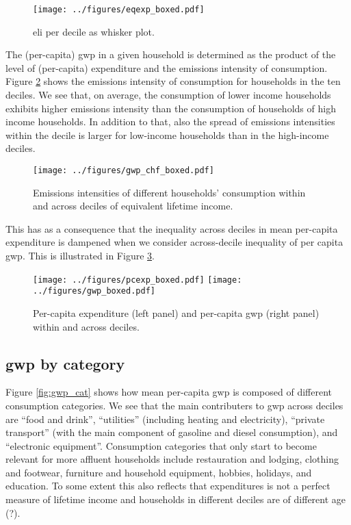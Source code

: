 \documentclass[a4paper,11pt]{article}
\begin{document}
\begin{figure}[htp]
  \centering
  \texttt{[image: ../figures/eqexp\_boxed.pdf]}
  \caption{\ac{eli} per decile as whisker plot.}
  \label{fig:eli}
\end{figure}

The (per-capita) \ac{gwp} in a given household is determined as the product of the level of (per-capita) expenditure and the emissions intensity of consumption.
Figure \ref{fig:int} shows the emissions intensity of consumption for households in the ten deciles.
We see that, on average, the consumption of lower income households exhibits higher emissions intensity than the consumption of households of high income households.
In addition to that, also the spread of emissions intensities within the decile is larger for low-income households than in the high-income deciles.

\begin{figure}[htp]
  \centering
  \texttt{[image: ../figures/gwp\_chf\_boxed.pdf]}
  \caption[Emissions intensities across deciles]{Emissions intensities of different households' consumption within and across deciles of equivalent lifetime income.}
  \label{fig:int}
\end{figure}

This has as a consequence that the inequality across deciles in mean per-capita expenditure is dampened when we consider across-decile inequality of per capita \ac{gwp}.
This is illustrated in Figure \ref{fig:exp_gwp}.

\begin{figure}[htp]
  \centering
  \texttt{[image: ../figures/pcexp\_boxed.pdf]}
  \texttt{[image: ../figures/gwp\_boxed.pdf]}
  \caption[Expenditures and \ac{gwp}]{Per-capita expenditure (left panel) and per-capita \ac{gwp} (right panel) within and across deciles. }
  \label{fig:exp_gwp}
\end{figure}

\clearpage
\subsection{\ac{gwp} by category}
\label{sec:cats}

Figure \ref{fig:gwp_cat} shows how mean per-capita \ac{gwp} is composed of different consumption categories.
We see that the main contributers to \ac{gwp} across deciles are ``food and drink'', ``utilities'' (including heating and electricity), ``private transport'' (with the main component of gasoline and diesel consumption), and ``electronic equipment''.
Consumption categories that only start to become relevant for more affluent households include restauration and lodging, clothing and footwear, furniture and household equipment, hobbies, holidays, and education.
To some extent this also reflects that expenditures is not a perfect measure of lifetime income and households in different deciles are of different age (?).
\end{document}
